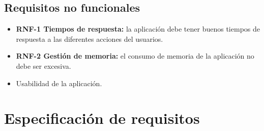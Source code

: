 \subsection{Requisitos no funcionales}

\begin{itemize}
	\item \textbf{RNF-1 Tiempos de respuesta:} la aplicación debe tener buenos tiempos de respuesta a las diferentes acciones del usuarios. 
	\item \textbf{RNF-2 Gestión de memoria:} el consumo de memoria de la aplicación no debe ser excesiva.
	\item Usabilidad de la aplicación.
\end{itemize}


\section{Especificación de requisitos}


